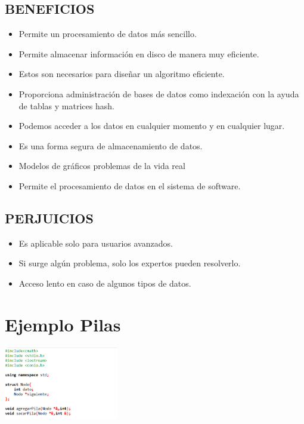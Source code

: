 \documentclass[twoside,twocolumn]{article}
\begin{document}
\subsection{BENEFICIOS}
\begin{itemize}
	\item Permite un procesamiento de datos más sencillo.
	\item Permite almacenar información en disco de manera muy eficiente.
	\item Estos son necesarios para diseñar un algoritmo eficiente.
	\item Proporciona administración de bases de datos como indexación con la ayuda de tablas y matrices hash.
	\item Podemos acceder a los datos en cualquier momento y en cualquier lugar.
	\item Es una forma segura de almacenamiento de datos.
	\item Modelos de gráficos problemas de la vida real 
	\item Permite el procesamiento de datos en el sistema de software.
\end{itemize}

\subsection{PERJUICIOS}

\begin{itemize}	
\item Es aplicable solo para usuarios avanzados.
\item Si surge algún problema, solo los expertos pueden resolverlo.
\item Acceso lento en caso de algunos tipos de datos.
\end{itemize}
\section{Ejemplo Pilas}

\begin{center}
	\includegraphics[width=5cm]{./img/7.png} 
\end{center}
\end{document}
